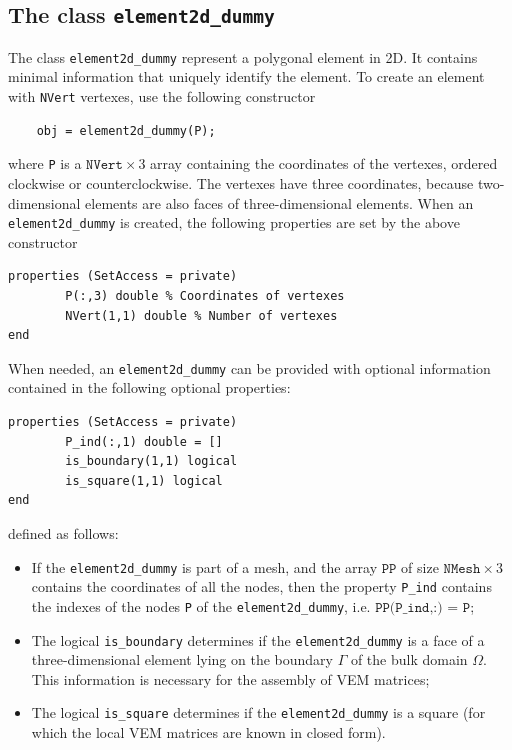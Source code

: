 \documentclass[a4paper]{article}
\begin{document}
\subsection{The class \texttt{element2d\_dummy}}
The class \texttt{element2d\_dummy} represent a polygonal element in 2D. It contains minimal information that uniquely identify the element. To create an element with \texttt{NVert} vertexes, use the following constructor
\begin{lstlisting}
	obj = element2d_dummy(P);
\end{lstlisting}
where \texttt{P} is a $\texttt{NVert} \times 3$ array containing the coordinates of the vertexes, ordered clockwise or counterclockwise. The vertexes have three coordinates, because two-dimensional elements are also faces of three-dimensional elements. When an \texttt{element2d\_dummy} is created, the following properties are set by the above constructor
\begin{lstlisting}
properties (SetAccess = private)
        P(:,3) double % Coordinates of vertexes
        NVert(1,1) double % Number of vertexes
end
\end{lstlisting}
When needed, an \texttt{element2d\_dummy} can be provided with optional information contained in the following optional properties:
\begin{lstlisting}
properties (SetAccess = private)
        P_ind(:,1) double = []
        is_boundary(1,1) logical
        is_square(1,1) logical
end
\end{lstlisting}
defined as follows:
\begin{itemize}
\item If the \texttt{element2d\_dummy} is part of a mesh, and the array $\texttt{PP}$ of size $\texttt{NMesh} \times 3$ contains the coordinates of all the nodes, then the property \texttt{P\_ind} contains the indexes of the nodes \texttt{P} of the \texttt{element2d\_dummy}, i.e. $\texttt{PP(P\_ind,:) = P}$;
\item The logical \texttt{is\_boundary} determines if the \texttt{element2d\_dummy} is a face of a three-dimensional element lying on the boundary $\Gamma$ of the bulk domain $\Omega$. This information is necessary for the assembly of VEM matrices; 
\item The logical \texttt{is\_square} determines if the \texttt{element2d\_dummy} is a square (for which the local VEM matrices are known in closed form).
\end{itemize}
\end{document}
